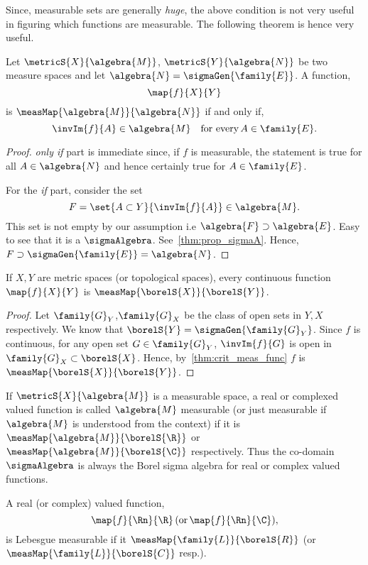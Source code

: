 Since, measurable sets are generally \emph{huge}, the above condition is not very useful in figuring which
functions are measurable. The following theorem is hence very useful.
\begin{Theorem}[name=Criteria for measurable functions]\label{thm:crit_meas_func}
    Let $\metricS{X}{\algebra{M}}$, $\metricS{Y}{\algebra{N}}$ be two measure spaces and let $\algebra{N} =
    \sigmaGen{\family{E}}$. A function,
    \[\map{f}{X}{Y}\]
    is $\measMap{\algebra{M}}{\algebra{N}}$ if and only if,
    \[\invIm{f}{A} \in \algebra{M}\quad\text{for every}\,{A\in\family{E}}.\]
\end{Theorem}
\begin{proof}
    \emph{only if} part is immediate since, if $f$ is measurable, the statement is true for all $A \in
    \algebra{N}$ and hence certainly true for $A \in \family{E}$. 

    For the \emph{if} part, consider the set
    \[F = \set{A \subset Y}{\invIm{f}{A}} \in \algebra{M}.\]
    This set is not empty by our assumption i.e $\algebra{F} \supset \algebra{E}$. 
    Easy to see that it is a $\sigmaAlgebra$. See~\ref{thm:prop_sigmaA}. 
    Hence, $F \supset \sigmaGen{\family{E}} = \algebra{N}$.
\end{proof}
\begin{Corollary}\label{thm:continuous_func_meas}
    If $X,Y$ are metric spaces (or topological spaces), every continuous function $\map{f}{X}{Y}$ is
    $\measMap{\borelS{X}}{\borelS{Y}}$.
\end{Corollary}
\begin{proof}
    Let $\family{G}_{Y}$,$\family{G}_{X}$ be the class of open sets in $Y,X$ respectively. 
    We know that $\borelS{Y} = \sigmaGen{\family{G}_{Y}}$. Since $f$ is continuous, 
    for any open set $G \in \family{G}_Y$,
    $\invIm{f}{G}$ is open in $\family{G}_X \subset \borelS{X}$. Hence, by~\ref{thm:crit_meas_func}
    $f$ is $\measMap{\borelS{X}}{\borelS{Y}}$.
\end{proof}
\begin{Definition}[name=Real or Complex valued measurable functions]
    If $\metricS{X}{\algebra{M}}$ is a measurable space, a real or complexed valued function is called
    $\algebra{M}$ measurable (or just measurable if $\algebra{M}$ is understood from the context) if it is
    $\measMap{\algebra{M}}{\borelS{\R}}$ or $\measMap{\algebra{M}}{\borelS{\C}}$ respectively. 
    Thus the co-domain $\sigmaAlgebra$ is always the Borel sigma algebra for real or complex valued functions.
\end{Definition}
\begin{Definition}[name=Lebesgue measurable functions]
    A real (or complex) valued function,
    \[\map{f}{\Rn}{\R}\,(\text{or}\,\map{f}{\Rn}{\C}),\]
    is Lebesgue measurable if it $\measMap{\family{L}}{\borelS{R}}$ (or $\measMap{\family{L}}{\borelS{C}}$
    resp.).
\end{Definition}

